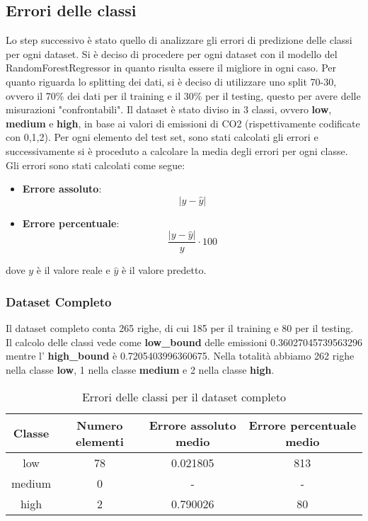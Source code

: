 \subsection{Errori delle classi}

Lo step successivo è stato quello di analizzare gli errori di predizione delle classi per ogni dataset.
Si è deciso di procedere per ogni dataset con il modello del RandomForestRegressor in quanto risulta essere il migliore in ogni caso.
Per quanto riguarda lo splitting dei dati, si è deciso di utilizzare uno split 70-30, ovvero il 70\% dei dati per il training e il 30\% per il testing, questo per avere delle misurazioni "confrontabili".
Il dataset è stato diviso in 3 classi, ovvero \textbf{low}, \textbf{medium} e \textbf{high}, in base ai valori di emissioni di CO2 (rispettivamente codificate con 0,1,2).
Per ogni elemento del test set, sono stati calcolati gli errori e successivamente si è proceduto a calcolare la media degli errori per ogni classe.
Gli errori sono stati calcolati come segue:
\begin{itemize}
    \item \textbf{Errore assoluto}:\begin{equation*}
        |y - \hat{y}|
         \end{equation*}
    \item \textbf{Errore percentuale}: \begin{equation*}
        \frac{|y - \hat{y}|}{y} \cdot 100
    \end{equation*}
\end{itemize}
dove $y$ è il valore reale e $\hat{y}$ è il valore predetto.


\subsubsection{Dataset Completo}

Il dataset completo conta 265 righe, di cui 185 per il training e 80 per il testing.
Il calcolo delle classi vede come \textbf{low\_bound} delle emissioni 0.36027045739563296 mentre l' \textbf{high\_bound} è 0.7205403996360675.
Nella totalità abbiamo 262 righe nella classe \textbf{low}, 1 nella classe \textbf{medium} e 2 nella classe \textbf{high}.


\begin{table}[H]
    \centering
    \begin{tabular}{|c|c|c|c|}
        \hline
        \textbf{Classe} &  \textbf{Numero elementi} & \textbf{Errore assoluto medio} & \textbf{Errore percentuale medio} \\ \hline
        low             & 78                & 0.021805                   & 813            \\ \hline
        medium          & 0                & -                  & -            \\ \hline
        high            & 2                & 0.790026                   & 80            \\ \hline
    \end{tabular}
    \caption{Errori delle classi per il dataset completo}
\end{table}

